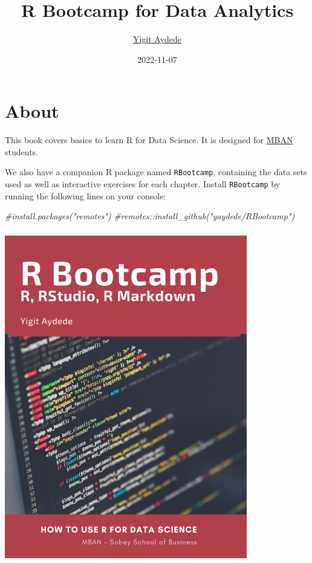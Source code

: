 \documentclass[
]{book}
\title{R Bootcamp for Data Analytics}
\author{\href{https://yaydede.github.io/}{Yigit Aydede}}
\date{2022-11-07}
\newenvironment{Shaded}{\begin{snugshade}}{\end{snugshade}}
\newcommand{\CommentTok}[1]{\textcolor[rgb]{0.56,0.35,0.01}{\textit{#1}}}
\begin{document}
\maketitle

{
\hypersetup{linkcolor=}
\setcounter{tocdepth}{1}
\tableofcontents
}
\hypertarget{about}{%
\chapter*{About}\label{about}}

This book covers basics to learn R for Data Science. It is designed for \href{https://www.smu.ca/mban/index.html}{MBAN} students.

We also have a companion R package named \texttt{RBootcamp}, containing the data sets used as well as interactive exercises for each chapter. Install \texttt{RBootcamp} by running the following lines on your console:

\begin{Shaded}
\begin{Highlighting}[]
\CommentTok{\#install.packages("remotes")}
\CommentTok{\#remotes::install\_github("yaydede/RBootcamp")}
\end{Highlighting}
\end{Shaded}

\includegraphics[width=4.16667in,height=5.72917in]{png/cover2.png}
\end{document}
